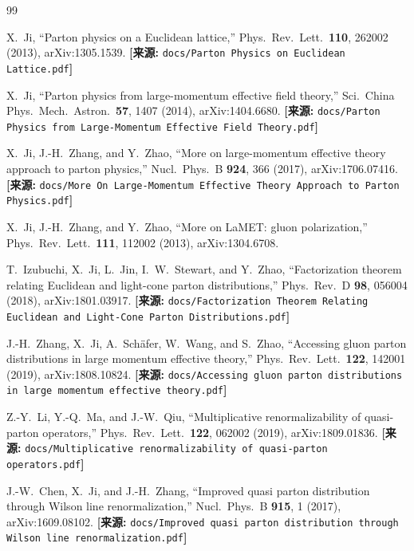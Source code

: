 \documentclass[12pt,a4paper]{ctexart}
\theoremstyle{definition}
\begin{document}
\begin{thebibliography}{99}

X.~Ji, ``Parton physics on a Euclidean lattice,''
Phys.\ Rev.\ Lett.\ \textbf{110}, 262002 (2013), arXiv:1305.1539.
\quad\textbf{[来源:} \texttt{docs/Parton Physics on Euclidean Lattice.pdf}\textbf{]}

X.~Ji, ``Parton physics from large-momentum effective field theory,''
Sci.\ China Phys.\ Mech.\ Astron.\ \textbf{57}, 1407 (2014), arXiv:1404.6680.
\quad\textbf{[来源:} \texttt{docs/Parton Physics from Large-Momentum Effective Field Theory.pdf}\textbf{]}

X.~Ji, J.-H.~Zhang, and Y.~Zhao, ``More on large-momentum effective theory approach to parton physics,''
Nucl.\ Phys.\ B \textbf{924}, 366 (2017), arXiv:1706.07416.
\quad\textbf{[来源:} \texttt{docs/More On Large-Momentum Effective Theory Approach to Parton Physics.pdf}\textbf{]}

X.~Ji, J.-H.~Zhang, and Y.~Zhao, ``More on LaMET: gluon polarization,''
Phys.\ Rev.\ Lett.\ \textbf{111}, 112002 (2013), arXiv:1304.6708.

T.~Izubuchi, X.~Ji, L.~Jin, I.~W.~Stewart, and Y.~Zhao,
``Factorization theorem relating Euclidean and light-cone parton distributions,''
Phys.\ Rev.\ D \textbf{98}, 056004 (2018), arXiv:1801.03917.
\quad\textbf{[来源:} \texttt{docs/Factorization Theorem Relating Euclidean and Light-Cone Parton Distributions.pdf}\textbf{]}

J.-H.~Zhang, X.~Ji, A.~Sch\"afer, W.~Wang, and S.~Zhao,
``Accessing gluon parton distributions in large momentum effective theory,''
Phys.\ Rev.\ Lett.\ \textbf{122}, 142001 (2019), arXiv:1808.10824.
\quad\textbf{[来源:} \texttt{docs/Accessing gluon parton distributions in large momentum effective theory.pdf}\textbf{]}

Z.-Y.~Li, Y.-Q.~Ma, and J.-W.~Qiu,
``Multiplicative renormalizability of quasi-parton operators,''
Phys.\ Rev.\ Lett.\ \textbf{122}, 062002 (2019), arXiv:1809.01836.
\quad\textbf{[来源:} \texttt{docs/Multiplicative renormalizability of quasi-parton operators.pdf}\textbf{]}

J.-W.~Chen, X.~Ji, and J.-H.~Zhang,
``Improved quasi parton distribution through Wilson line renormalization,''
Nucl.\ Phys.\ B \textbf{915}, 1 (2017), arXiv:1609.08102.
\quad\textbf{[来源:} \texttt{docs/Improved quasi parton distribution through Wilson line renormalization.pdf}\textbf{]}


\end{thebibliography}
\end{document}
